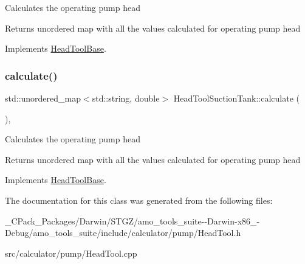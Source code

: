 Calculates the operating pump head \begin{DoxyReturn}{Returns}
unordered map with all the values calculated for operating pump head 
\end{DoxyReturn}


Implements \hyperlink{class_head_tool_base_ab8df8f908827ce45dc5e769ea0e10f0b}{Head\+Tool\+Base}.

\mbox{\label{class_head_tool_suction_tank_a7e4a6931caa7c9be43992aecdfb80bec}} 
\subsubsection{\texorpdfstring{calculate()}{calculate()}\hspace{0.1cm}{\footnotesize\ttfamily [3/3]}}
{\footnotesize\ttfamily std\+::unordered\+\_\+map$<$std\+::string, double$>$ Head\+Tool\+Suction\+Tank\+::calculate (\begin{DoxyParamCaption}{ }\end{DoxyParamCaption})\hspace{0.3cm}{\ttfamily [override]}, {\ttfamily [virtual]}}

Calculates the operating pump head \begin{DoxyReturn}{Returns}
unordered map with all the values calculated for operating pump head 
\end{DoxyReturn}


Implements \hyperlink{class_head_tool_base_ab8df8f908827ce45dc5e769ea0e10f0b}{Head\+Tool\+Base}.



The documentation for this class was generated from the following files\+:\begin{DoxyCompactItemize}
\item 
\+\_\+\+C\+Pack\+\_\+\+Packages/\+Darwin/\+S\+T\+G\+Z/amo\+\_\+tools\+\_\+suite-\/-\/\+Darwin-\/x86\+\_-\/\+Debug/amo\+\_\+tools\+\_\+suite/include/calculator/pump/Head\+Tool.\+h\item 
src/calculator/pump/Head\+Tool.\+cpp\end{DoxyCompactItemize}
